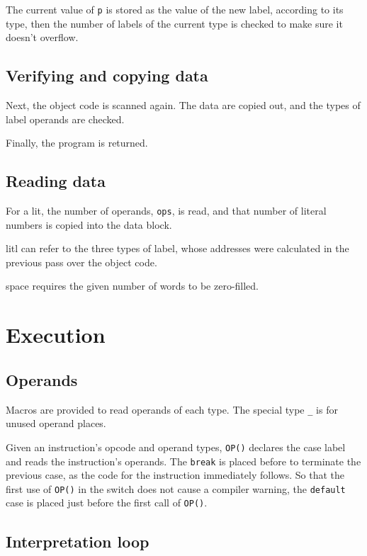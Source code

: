 \documentclass[english]{scrartcl}
\newcommand{\absfont}{\sffamily}
\newcommand{\abs}[1]{{\absfont #1}}
\begin{document}
The current value of \verb|p| is stored as the value of the new label,
according to its type, then the number of labels of the current type
is checked to make sure it doesn't overflow.


\subsection{Verifying and copying data}

Next, the object code is scanned again. The data are copied out, and
the types of label operands are checked.

Finally, the program is returned.


\subsection{Reading data}

For a \abs{lit}, the number of operands, \verb|ops|, is read, and that
number of literal numbers is copied into the data block.

\abs{litl} can refer to the three types of label, whose addresses were
calculated in the previous pass over the object code.

\abs{space} requires the given number of words to be zero-filled.



\section{Execution}

\subsection{Operands}

Macros are provided to read operands of each type. The special type
\verb|_| is for unused operand places.

Given an instruction's opcode and operand types, \verb|OP()| declares
the case label and reads the instruction's operands. The \verb|break|
is placed before to terminate the previous case, as the code for the
instruction immediately follows. So that the first use of \verb|OP()|
in the switch does not cause a compiler warning, the \verb|default|
case is placed just before the first call of \verb|OP()|.


\subsection{Interpretation loop}
\end{document}
